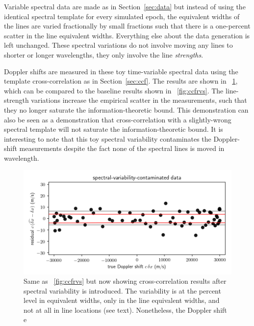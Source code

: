 \documentclass[modern]{aastex631}
\newcommand{\sectionname}{Section}
\newcommand{\secref}[1]{\sectionname~\ref{#1}}
\newcommand{\figref}[1]{\figurename~\ref{#1}}
\begin{document}
Variable spectral data are made as in \secref{sec:data} but instead of using the identical spectral template for every simulated epoch, the equivalent widths of the lines are varied fractionally by small fractions such that there is a one-percent scatter in the line equivalent widths.
Everything else about the data generation is left unchanged.
These spectral variations do not involve moving any lines to shorter or longer wavelengths, they only involve the line \emph{strengths}.

Doppler shifts are measured in these toy time-variable spectral data using the template cross-correlation as in \secref{sec:ccf}.
The results are shown in \figref{fig:variable}, which can be compared to the baseline results shown in \figref{fig:ccfrvs}.
The line-strength variations increase the empirical scatter in the measurements, such that they no longer saturate the information-theoretic bound.
This demonstration can also be seen as a demonstration that cross-correlation with a slightly-wrong spectral template will not saturate the information-theoretic bound.
It is interesting to note that this toy spectral variability contaminates the Doppler-shift measurements despite the fact none of the spectral lines is moved in wavelength.

\begin{figure}[tp]
  \begin{mdframed}
    \begin{center}
    \includegraphics[width=\textwidth]{../notebook/variable.png}
    \end{center}
    \caption{Same as \figref{fig:ccfrvs} but now showing cross-correlation results after spectral variability is introduced. The variability is at the percent level in equivalent widths, only in the line equivalent widths, and not at all in line locations (see text). Nonetheless, the Doppler shift e\label{fig:variable}}
  \end{mdframed}
\end{figure}
\end{document}
